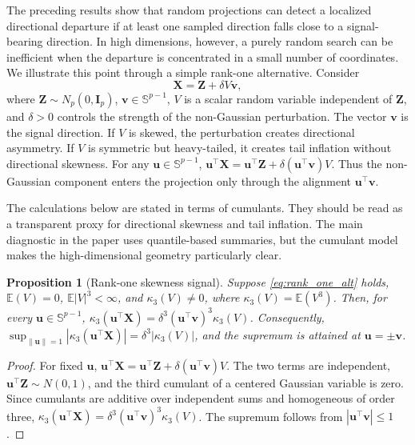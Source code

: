 \documentclass[11pt]{article}
\theoremstyle{plain}
\newtheorem{proposition}{Proposition}
\theoremstyle{definition}
\theoremstyle{remark}
\def\E{\mathbb{E}}
\def\X{\bm{X}}
\def\u{\bm{u}}
\def\v{\bm{v}}
\newcommand{\identity}{\mathbf{I}}
\newcommand{\abs}[1]{\left\lvert #1 \right\rvert}
\begin{document}
The preceding results show that random projections can detect a localized directional departure if at least one sampled direction falls close to a signal-bearing direction. In high dimensions, however, a purely random search can be inefficient when the departure is concentrated in a small number of coordinates. We illustrate this point through a simple rank-one alternative. Consider
\begin{equation}
    \label{eq:rank_one_alt}
    \X = \bm{Z} + \delta V \bm{v},
\end{equation}
where \(\bm{Z}\sim N_p(0,\identity_p)\), \(\v\in \mathbb{S}^{p-1}\), \(V\) is a scalar random variable independent of \(\bm Z\), and \(\delta>0\) controls the strength of the non-Gaussian perturbation. The vector \(\v\) is the signal direction. If \(V\) is skewed, the perturbation creates directional asymmetry. If \(V\) is symmetric but heavy-tailed, it creates tail inflation without directional skewness. For any \(\u\in \mathbb{S}^{p-1}\), \(\u^\top \X = \u^\top \bm Z+\delta(\u^\top \v)V\). Thus the non-Gaussian component enters the projection only through the alignment \(\u^\top \v\).

The calculations below are stated in terms of cumulants. They should be read as a transparent proxy for directional skewness and tail inflation. The main diagnostic in the paper uses quantile-based summaries, but the cumulant model makes the high-dimensional geometry particularly clear.

\begin{proposition}[Rank-one skewness signal]
	\label{prop:rank_one_third_cumulant}
	Suppose \eqref{eq:rank_one_alt} holds, \(\E(V)=0\), \(\E|V|^3<\infty\), and \(\kappa_3(V)\ne0\), where \(\kappa_3(V)=\E(V^3)\). Then, for every \(\u\in \mathbb{S}^{p-1}\), $\kappa_3(\u^\top \X)=\delta^3 (\u^\top \v)^3\kappa_3(V)$. Consequently, \(\sup_{\|\u\| =1} \abs{\kappa_3(\u^\top \X)} = \delta^3 \abs{\kappa_3(V)}\), and the supremum is attained at \(\u=\pm \v\).
\end{proposition}

\begin{proof}
	For fixed $\u$, \(\u^\top \X=\u^\top \bm Z+\delta(\u^\top \v)V\). The two terms are independent, \(\u^\top \bm Z \sim N(0,1)\), and the third cumulant of a centered Gaussian variable is zero. Since cumulants are additive over independent sums and homogeneous of order three, \(\kappa_3(\u^\top \X)=\delta^3(\u^\top \v)^3\kappa_3(V)\). The supremum follows from \(|\u^\top \v| \leqslant 1\).
\end{proof}
\end{document}
